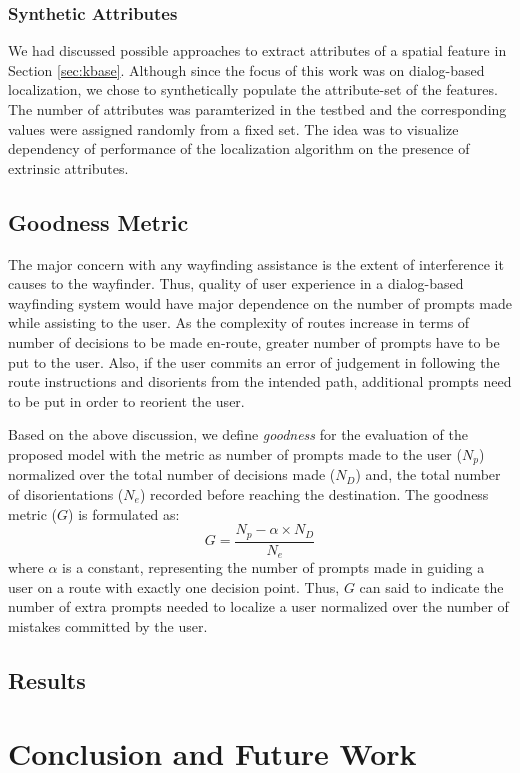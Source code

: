\documentclass{iitkthesis}
\begin{document}
  \subsection{Synthetic Attributes}
We had discussed possible approaches to extract attributes of a spatial feature in Section \ref{sec:kbase}.  Although since the focus of this work was on dialog-based localization, we chose to synthetically populate the attribute-set of the features. The number of attributes was paramterized in the testbed and the corresponding values were assigned randomly from a fixed set. The idea was to visualize dependency of performance of the localization algorithm on the presence of extrinsic attributes. 
 \section{Goodness Metric}
The major concern with any wayfinding assistance is the extent of interference it causes to the wayfinder. Thus, quality of user experience in a dialog-based wayfinding system would have major dependence on the number of prompts made while assisting to the user. As the complexity of routes increase in terms of number of decisions to be made en-route, greater number of prompts have to be put to the user. Also, if the user commits an error of judgement in following the route instructions and disorients from the intended path, additional prompts need to be put in order to reorient the user. 

Based on the above discussion, we define \textit{goodness} for the evaluation of the proposed model with the metric as number of prompts made to the user ($N_p$) normalized over the total number of decisions made ($N_D$) and, the total number of disorientations ($N_e$) recorded before reaching the destination. The goodness metric ($G$) is formulated as: 
\[\displaystyle G = \frac{N_p - \alpha \times N_D}{N_e}\]  
where $\alpha$ is a constant, representing the number of prompts made in guiding a user on a route with exactly one decision point. Thus, $G$ can said to indicate the number of extra prompts needed to localize a user normalized over the number of mistakes committed by the user.
 \section{Results} 
 \chapter{Conclusion and Future Work}


\end{document}

